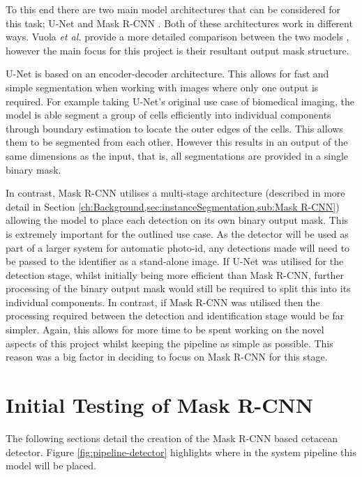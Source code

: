 To this end there are two main model architectures that can be considered for this task; U-Net \cite{ronneberger_u-net_2015} and Mask R-CNN \cite{he_mask_2017}. Both of these architectures work in different ways. Vuola \textit{et al.} provide a more detailed comparison between the two models \cite{vuola_mask-rcnn_2019}, however the main focus for this project is their resultant output mask structure. 

U-Net is based on an encoder-decoder architecture. This allows for fast and simple segmentation when working with images where only one output is required. For example taking U-Net's original use case of biomedical imaging, the model is able segment a group of cells efficiently into individual components through boundary estimation to locate the outer edges of the cells. This allows them to be segmented from each other. However this results in an output of the same dimensions as the input, that is, all segmentations are provided in a single binary mask. 

In contrast, Mask R-CNN utilises a multi-stage architecture (described in more detail in Section \ref{ch:Background,sec:instanceSegmentation,sub:Mask R-CNN}) allowing the model to place each detection on its own binary output mask. This is extremely important for the outlined use case. As the detector will be used as part of a larger system for automatic photo-id, any detections made will need to be passed to the identifier as a stand-alone image. If U-Net was utilised for the detection stage, whilst initially being more efficient than Mask R-CNN, further processing of the binary output mask would still be required to split this into its individual components. In contrast, if Mask R-CNN was utilised then the processing required between the detection and identification stage would be far simpler. Again, this allows for more time to be spent working on the novel aspects of this project whilst keeping the pipeline as simple as possible. This reason was a big factor in deciding to focus on Mask R-CNN for this stage. 

\section{Initial Testing of Mask R-CNN}\label{ch:cetDet,sec:initialTesting}

The following sections detail the creation of the Mask R-CNN based cetacean detector. Figure \ref{fig:pipeline-detector} highlights where in the system pipeline this model will be placed.


